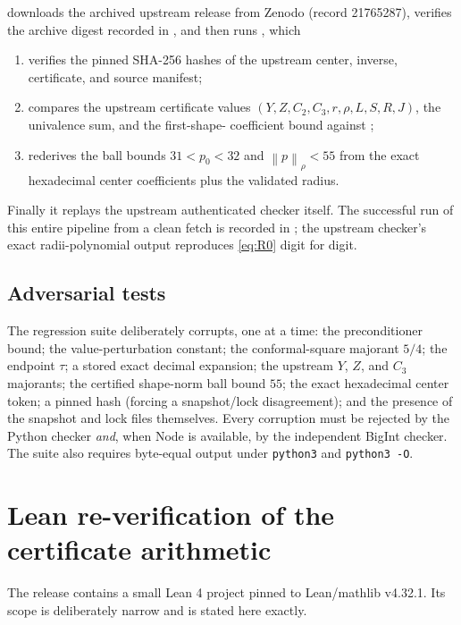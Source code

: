 \documentclass[11pt]{amsart}
\newcommand{\norm}[1]{\left\lVert #1\right\rVert}
\begin{document}
 downloads the archived
upstream release from Zenodo (record 21765287), verifies the archive
digest recorded in , and then runs
, which
\begin{enumerate}[leftmargin=2.2em]
  \item verifies the pinned SHA-256 hashes of the upstream center, inverse,
  certificate, and source manifest;
  \item compares the upstream certificate values
  $(Y,Z,C_2,C_3,r,\rho,L,S,R,J)$, the univalence sum, and the first-shape-%
  coefficient bound against ;
  \item rederives the ball bounds $31<p_0<32$ and $\norm p_\rho<55$ from
  the exact hexadecimal center coefficients plus the validated radius.
\end{enumerate}
Finally it replays the upstream authenticated checker
 itself.  The successful run of this entire
pipeline from a clean fetch is recorded in
; the upstream checker's exact
radii-polynomial output reproduces \eqref{eq:R0} digit for digit.

\subsection{Adversarial tests}

The regression suite deliberately corrupts, one at a time: the
preconditioner bound; the value-perturbation constant; the conformal-square
majorant $5/4$; the endpoint $\tau$; a stored exact decimal expansion; the
upstream $Y$, $Z$, and $C_3$ majorants; the certified shape-norm ball bound
$55$; the exact hexadecimal center token; a pinned hash (forcing a
snapshot/lock disagreement); and the presence of the snapshot and lock
files themselves.  Every corruption must be rejected by the Python checker
\emph{and}, when Node is available, by the independent BigInt checker.
The suite also requires byte-equal output under \texttt{python3} and
\texttt{python3 -O}.

\section{Lean re-verification of the certificate arithmetic}

The release contains a small Lean 4 project pinned to Lean/mathlib
v4.32.1.  Its scope is deliberately narrow and is stated here exactly.
\end{document}
